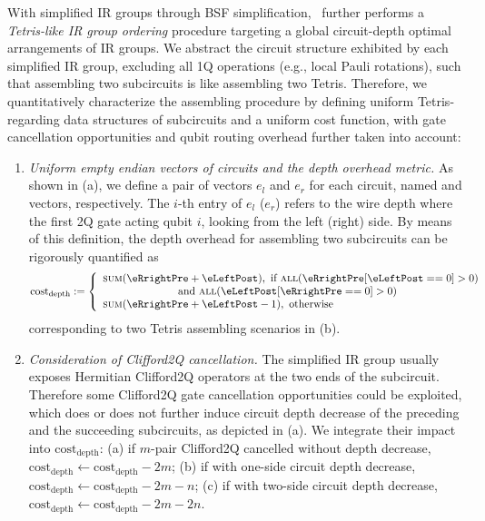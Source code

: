 
With simplified IR groups through BSF simplification, \phoenix\ further performs a \emph{Tetris-like IR group ordering} procedure targeting a global circuit-depth optimal arrangements of IR groups. We abstract the circuit structure exhibited by each simplified IR group, excluding all 1Q operations (e.g., local Pauli rotations), such that assembling two subcircuits is like assembling two Tetris. Therefore, we quantitatively characterize the assembling procedure by defining uniform Tetris-regarding data structures of subcircuits and a uniform cost function, with gate cancellation opportunities and qubit routing overhead further taken into account:
\begin{enumerate}
    \item \textit{Uniform empty endian vectors of circuits and the depth overhead metric.} As shown in  (a), we define a pair of vectors $e_l$ and $e_r$ for each circuit, named  and  vectors, respectively. The $i$-th entry of $e_l$ ($e_r$) refers to the wire depth where the first 2Q gate acting qubit $i$, looking from the left (right) side. %
    By means of this definition, the depth overhead for assembling two subcircuits can be rigorously quantified as
    \begin{align*}
        \mathrm{cost}_\mathrm{depth} :=  
                \left\{
                \begin{array}{ll}
                \textsc{sum}(\eRrightPre + \eLeftPost),  \text{ if } \textsc{all}(\eRrightPre[\eLeftPost == 0] > 0) \\\qquad \text{    }\qquad\text{    }\qquad\text{   }\text{and }\textsc{all}(\eLeftPost[\eRrightPre == 0] > 0) \\
                \textsc{sum}(\eRrightPre + \eLeftPost - 1), \text{ otherwise    }
                \end{array}
                \right.
    \end{align*}
    corresponding to two Tetris assembling scenarios in  (b).
    \item \emph{Consideration of Clifford2Q cancellation.} The simplified IR group usually exposes Hermitian Clifford2Q operators at the two ends of the subcircuit. Therefore some Clifford2Q gate cancellation opportunities could be exploited, which does or does not further induce circuit depth decrease of the preceding and the succeeding subcircuits, as depicted in  (a). We integrate their impact into $\mathrm{cost}_\mathrm{depth}$: (a) if $m$-pair Clifford2Q cancelled without depth decrease, $\mathrm{cost}_\mathrm{depth} \gets \mathrm{cost}_\mathrm{depth} - 2m$; (b) if with one-side circuit depth decrease, $\mathrm{cost}_\mathrm{depth} \gets \mathrm{cost}_\mathrm{depth} -2m -n$; (c) if with two-side circuit depth decrease, $\mathrm{cost}_\mathrm{depth} \gets \mathrm{cost}_\mathrm{depth} - 2m -2n$.

\end{enumerate}
